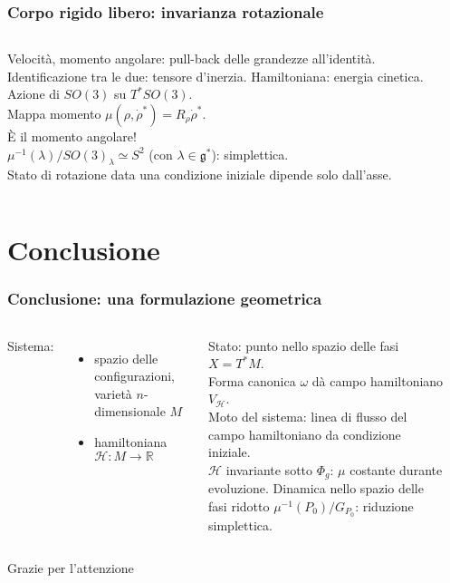 \documentclass[]{beamer}
\newcommand{\R}{\mathbb{R}}
\begin{document}
\begin{frame}
\frametitle{Corpo rigido libero: invarianza rotazionale}
\begin{columns}
  Velocità, momento angolare: pull-back delle grandezze all'identità.\\
  Identificazione tra le due: tensore d'inerzia.
  Hamiltoniana: energia cinetica.\\[11pt]
  Azione di $SO(3)$ su $T^* SO(3)$.\\
  Mappa momento $\mu(\rho, \dot{\rho}^*) = R_{\rho}\dot{\rho}^*$.\\ È il \alert{momento angolare}!\\[11pt]
  $\mu^{-1}(\lambda)/SO(3)_{\lambda} \simeq S^2$ (con $\lambda \in \mathfrak{g}^*$): simplettica.\\ 
  Stato di rotazione data una condizione iniziale dipende solo dall'asse.\\[11pt]
    \begin{center}
          
    \end{center}
\end{columns}
\end{frame}

\section{Conclusione}

\begin{frame}
\frametitle{Conclusione: una formulazione geometrica}
\begin{columns}
  Sistema: 
  \begin{itemize}
    \item {spazio delle configurazioni}, varietà $n$-dimensionale $M$
    \item {hamiltoniana} $\mathcal{H}: M\to \R$
  \end{itemize}
  {Stato}: punto nello {spazio delle fasi} $X = T^* M$.\\ 
  {Forma canonica} $\omega$ dà {campo hamiltoniano} $V_{\mathcal{H}}$.\\[5pt]
  \alert{Moto del sistema: linea di flusso del campo hamiltoniano da condizione iniziale.}\\[5pt]
  \alert{$\mathcal{H}$ invariante sotto $\Phi_g$: $\mu$ costante durante evoluzione.} Dinamica nello spazio delle fasi ridotto $\mu^{-1}(P_0)/G_{P_0}$: riduzione simplettica. 
    \begin{center}
      
    \end{center}
\end{columns}
\end{frame}

\appendix
\begin{frame}[plain]
\hspace{0pt}
\vfill
\begin{center}
  \Huge Grazie per l'attenzione
\end{center}
\vfill
\hspace{0pt}
\end{frame}
\end{document}
